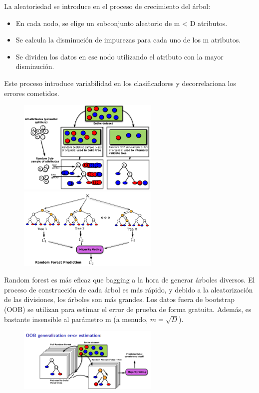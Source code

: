 La aleatoriedad se introduce en el proceso de crecimiento del árbol:
\begin{itemize}
\item En cada nodo, se elige un subconjunto aleatorio de m < D atributos.
\item Se calcula la disminución de impurezas para cada uno de los m atributos.
\item Se dividen los datos en ese nodo utilizando el atributo con la mayor disminución.
\end{itemize}

Este proceso introduce variabilidad en los clasificadores y decorrelaciona los errores cometidos.

\begin{figure}[h]
\centering
\includegraphics[width = 0.6\textwidth]{figs/random-forest-indv.png}
\includegraphics[width = 0.6\textwidth]{figs/random-forest-prediction.png}
\end{figure}

Random forest es más eficaz que bagging a la hora de generar árboles diversos. El proceso de construcción de cada árbol es más rápido, y debido a la aleatorización de las divisiones, los árboles son más grandes. Los datos fuera de bootstrap (OOB) se utilizan para estimar el error de prueba de forma gratuita. Además, es bastante insensible al parámetro m (a menudo, $m = \sqrt{D}$).

\begin{figure}[h]
\centering
\includegraphics[width = 0.6\textwidth]{figs/random-forest-error.png}
\end{figure}

